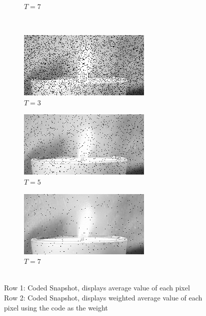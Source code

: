 \documentclass[a4paper, landscape]{article}
\begin{document}
\begin{figure}[H]
\begin{subfigure}{0.2\linewidth}
		\caption{$T=7$}
	\end{subfigure}\\
	\begin{subfigure}{0.2\linewidth}
		\centering
		\includegraphics[width=\linewidth]{flame/coded snapshot weighted averaging, T = 3.png}
		\caption{$T=3$}
	\end{subfigure}
	\begin{subfigure}{0.2\linewidth}
		\centering
		\includegraphics[width=\linewidth]{flame/coded snapshot weighted averaging, T = 5.png}
		\caption{$T=5$}
	\end{subfigure}
	\begin{subfigure}{0.2\linewidth}
		\centering
		\includegraphics[width=\linewidth]{flame/coded snapshot weighted averaging, T = 7.png}
		\caption{$T=7$}
	\end{subfigure}
	\caption{\\Row 1: Coded Snapshot, displays average value of each pixel\\Row 2: Coded Snapshot, displays weighted average value of each pixel using the code as the weight}
	\label{fig:fcs}
\end{figure}
\end{document}
